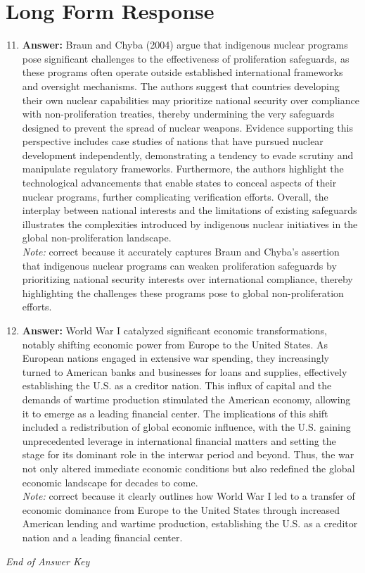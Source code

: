 \documentclass[12pt]{article}
\begin{document}
\section*{Long Form Response}
\begin{enumerate}[label=\arabic*.]
\setcounter{enumi}{10}
\item \textbf{Answer:} Braun and Chyba (2004) argue that indigenous nuclear programs pose significant challenges to the effectiveness of proliferation safeguards, as these programs often operate outside established international frameworks and oversight mechanisms. The authors suggest that countries developing their own nuclear capabilities may prioritize national security over compliance with non-proliferation treaties, thereby undermining the very safeguards designed to prevent the spread of nuclear weapons. Evidence supporting this perspective includes case studies of nations that have pursued nuclear development independently, demonstrating a tendency to evade scrutiny and manipulate regulatory frameworks. Furthermore, the authors highlight the technological advancements that enable states to conceal aspects of their nuclear programs, further complicating verification efforts. Overall, the interplay between national interests and the limitations of existing safeguards illustrates the complexities introduced by indigenous nuclear initiatives in the global non-proliferation landscape.
\\ \textit{Note:} correct because it accurately captures Braun and Chyba's assertion that indigenous nuclear programs can weaken proliferation safeguards by prioritizing national security interests over international compliance, thereby highlighting the challenges these programs pose to global non-proliferation efforts.
\item \textbf{Answer:} World War I catalyzed significant economic transformations, notably shifting economic power from Europe to the United States. As European nations engaged in extensive war spending, they increasingly turned to American banks and businesses for loans and supplies, effectively establishing the U.S. as a creditor nation. This influx of capital and the demands of wartime production stimulated the American economy, allowing it to emerge as a leading financial center. The implications of this shift included a redistribution of global economic influence, with the U.S. gaining unprecedented leverage in international financial matters and setting the stage for its dominant role in the interwar period and beyond. Thus, the war not only altered immediate economic conditions but also redefined the global economic landscape for decades to come.
\\ \textit{Note:} correct because it clearly outlines how World War I led to a transfer of economic dominance from Europe to the United States through increased American lending and wartime production, establishing the U.S. as a creditor nation and a leading financial center.
\end{enumerate}

\vfill
\noindent\textit{End of Answer Key}
\end{document}
